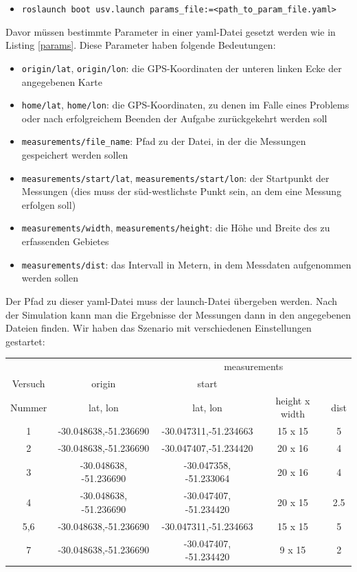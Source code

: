 \documentclass[11pt]{article}
\begin{document}
\begin{itemize} \label{launch}
	\item \texttt{roslaunch boot usv.launch params\_file:=<path\_to\_param\_file.yaml>}
\end{itemize}



Davor müssen bestimmte Parameter in einer yaml-Datei gesetzt werden wie in Listing \ref{params}. Diese Parameter haben folgende Bedeutungen:
\begin{itemize}
	\item \texttt{origin/lat}, \texttt{origin/lon}: die GPS-Koordinaten der unteren linken Ecke der angegebenen Karte
	\item \texttt{home/lat}, \texttt{home/lon}: die GPS-Koordinaten, zu denen im Falle eines Problems oder nach erfolgreichem Beenden der Aufgabe zurückgekehrt werden soll
	\item \texttt{measurements/file\_name}: Pfad zu der Datei, in der die Messungen gespeichert werden sollen
	\item \texttt{measurements/start/lat}, \texttt{measurements/start/lon}: der Startpunkt der Messungen (dies muss der süd-westlichste Punkt sein, an dem eine Messung erfolgen soll)
	\item \texttt{measurements/width}, \texttt{measurements/height}: die Höhe und Breite des zu erfassenden Gebietes
	\item \texttt{measurements/dist}: das Intervall in Metern, in dem Messdaten aufgenommen werden sollen
\end{itemize}
Der Pfad zu dieser yaml-Datei muss der launch-Datei übergeben werden. Nach der Simulation kann man die Ergebnisse der Messungen dann in den angegebenen Dateien finden.
Wir haben das Szenario mit verschiedenen Einstellungen gestartet:

\begin{center}
\begin{tabular}[t]{|c|c| c| c| c|}
	\hline
	& & \multicolumn{3}{c|}{measurements}\\
	Versuch&origin&start& & \\
	Nummer	&lat, lon 			& lat, lon 			& height x width & dist\\
	\hline
	1	&-30.048638,-51.236690		&-30.047311,-51.234663		&15 x 15	&5\\
	\hline
	2	&-30.048638,-51.236690 		& -30.047407,-51.234420 	&20 x 16	&4\\
	\hline
	3	& -30.048638, -51.236690	& -30.047358, -51.233064	& 20 x 16 	&4\\
	\hline
	4	& -30.048638, -51.236690	& -30.047407, -51.234420	& 20 x 15 	&2.5 \\
	\hline
	5,6	&-30.048638,-51.236690		&-30.047311,-51.234663		&15 x 15	&5\\
	\hline
	7	&-30.048638,-51.236690		& -30.047407, -51.234420	& 9 x 15	& 2\\
	\hline
\end{tabular}
\end{center}
\end{document}
